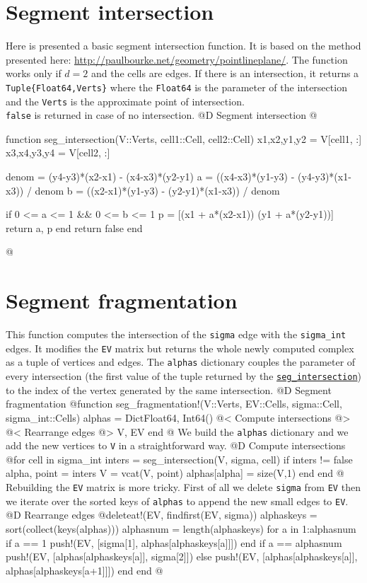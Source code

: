 \documentclass[10pt,oneside]{article}
\begin{document}
\section{Segment intersection}
\label{seg_intersection}
Here is presented a basic segment intersection function.
It is based on the method presented here: \url{http://paulbourke.net/geometry/pointlineplane/}.
The function works only if $d=2$ and the cells are edges.
If there is an intersection, it returns a \texttt{Tuple\{Float64,Verts\}} where 
the \texttt{Float64} is the parameter of the intersection and the \texttt{Verts} 
is the approximate point of intersection. \\
\texttt{false} is returned in case of no intersection.
@D Segment intersection
@{function seg_intersection(V::Verts, cell1::Cell, cell2::Cell)
    x1,x2,y1,y2 = V[cell1, :]
    x3,x4,y3,y4 = V[cell2, :]

    denom = (y4-y3)*(x2-x1) - (x4-x3)*(y2-y1)
    a = ((x4-x3)*(y1-y3) - (y4-y3)*(x1-x3)) / denom
    b = ((x2-x1)*(y1-y3) - (y2-y1)*(x1-x3)) / denom

    if 0 <= a <= 1 && 0 <= b <= 1
        p = [(x1 + a*(x2-x1))  (y1 + a*(y2-y1))]
        return a, p
    end
    return false
end

@}

\section{Segment fragmentation}
This function computes the intersection of the \texttt{sigma} edge with the \texttt{sigma\_int} edges.
It modifies the \texttt{EV} matrix but returns the whole newly computed complex as a tuple of vertices and edges.
The \texttt{alphas} dictionary couples the parameter of every intersection
(the first value of the tuple returned by the \hyperref[seg_intersection]{\texttt{seg\_intersection}})
to the index of the vertex generated by the same intersection.
@D Segment fragmentation
@{function seg_fragmentation!(V::Verts, EV::Cells, sigma::Cell, sigma_int::Cells)
    alphas = Dict{Float64, Int64}()
    @< Compute intersections @>
    @< Rearrange edges @>
    V, EV
end
@}
We build the \texttt{alphas} dictionary and we add the new vertices to \texttt{V} in a straightforward way.
@D Compute intersections
@{for cell in sigma_int
    inters = seg_intersection(V, sigma, cell)
    if inters != false
        alpha, point = inters
        V = vcat(V, point)
        alphas[alpha] = size(V,1)
    end
end
@}
Rebuilding the \texttt{EV} matrix is more tricky. First of all we delete \texttt{sigma} from \texttt{EV} then 
we iterate over the sorted keys of \texttt{alphas} to append the new small edges to \texttt{EV}.
@D Rearrange edges
@{deleteat!(EV, findfirst(EV, sigma))
alphaskeys = sort(collect(keys(alphas)))
alphasnum = length(alphaskeys)
for a in 1:alphasnum
    if a == 1
        push!(EV, [sigma[1], alphas[alphaskeys[a]]])
    end
    if a == alphasnum
        push!(EV, [alphas[alphaskeys[a]], sigma[2]])
    else
        push!(EV, [alphas[alphaskeys[a]], alphas[alphaskeys[a+1]]])
    end
end
@}
\end{document}
